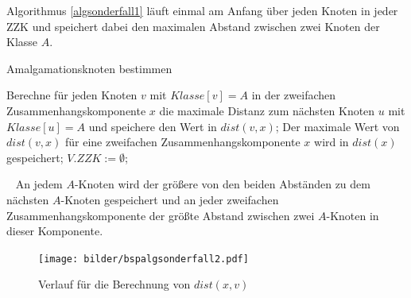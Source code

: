 Algorithmus \ref{algsonderfall1} läuft einmal am Anfang über jeden Knoten in jeder ZZK und speichert dabei den maximalen Abstand zwischen zwei Knoten der Klasse $A$.\\
\vspace{-3mm}
\begin{algorithm}
\caption{Amalgamationsknoten bestimmen}
\begin{algorithmic}[1]
\vspace{2mm}
\STATE Berechne für jeden Knoten $v$ mit $Klasse[v]=A$ in der zweifachen Zusammenhangskomponente $x$ die maximale Distanz zum nächsten Knoten $u$ mit $Klasse[u]=A$ und speichere den Wert in $dist(v,x)$;
\STATE Der maximale Wert von $dist(v,x)$ für eine zweifachen Zusammenhangskomponente $x$ wird in $dist(x)$ gespeichert;
\STATE $V.ZZK:= \emptyset$;
\ENDFOR
\end{algorithmic}
\label{algsonderfall1}
\end{algorithm}
\vspace{-4mm}
~\linebreak
An jedem $A$-Knoten wird der größere von den beiden Abständen zu dem nächsten $A$-Knoten gespeichert und an jeder zweifachen Zusammenhangskomponente der größte Abstand zwischen zwei $A$-Knoten in dieser Komponente.\\
\vspace{-2mm}
\begin{figure}[h!]
\centering
\texttt{[image: bilder/bspalgsonderfall2.pdf]}
\caption{Verlauf für die Berechnung von $dist(x,v)$}
\label{bild:distberechnung}
\end{figure}
\vspace{-2mm}
~\linebreak
